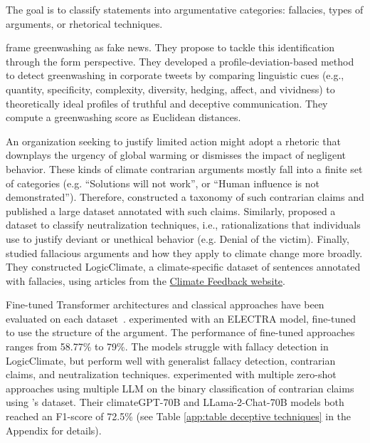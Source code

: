 \task The goal is to classify statements into argumentative categories: fallacies, types of arguments, or rhetorical techniques.

\zeroshot \citet{divinus_oppong-tawiah_corporate_2023} frame greenwashing as fake news. They propose to tackle this identification through the form perspective. 
They developed a profile-deviation-based method to detect greenwashing in corporate tweets by comparing linguistic cues (e.g., quantity, specificity, complexity, diversity, hedging, affect, and vividness) to theoretically ideal profiles of truthful and deceptive communication. They compute a greenwashing score as Euclidean distances.

\datasets An organization seeking to justify limited action might adopt a rhetoric that downplays the urgency of global warming or dismisses the impact of negligent behavior. These kinds of climate contrarian arguments mostly fall into a finite set of categories (e.g. ``Solutions will not work'', or ``Human influence is not demonstrated''). Therefore, \citet{coanComputerassistedClassificationContrarian2021} constructed a taxonomy of such contrarian claims and published a large dataset annotated with such claims. 
Similarly, \citet{bhatia_automatic_2021-1} proposed a dataset to classify neutralization techniques, i.e., rationalizations that individuals use to justify deviant or unethical behavior (e.g. Denial of the victim). Finally, \citet{jin-etal-2022-logical} studied fallacious arguments and how they apply to climate change more broadly. They constructed LogicClimate, a climate-specific dataset of sentences annotated with fallacies, using articles from the \href{https://science.feedback.org/reviews/?_topic=climate}{Climate Feedback website}.

\solutions Fine-tuned Transformer architectures and classical approaches have been evaluated on each dataset~\cite{jin-etal-2022-logical, bhatia_automatic_2021-1, coanComputerassistedClassificationContrarian2021}. \citet{jin-etal-2022-logical} experimented with an ELECTRA model, fine-tuned to use the structure of the argument. The performance of fine-tuned approaches ranges from 58.77\% to 79\%. The models struggle with fallacy detection in LogicClimate, but perform well with generalist fallacy detection, contrarian claims, and neutralization techniques. \citet{thulke2024climategpt} experimented with multiple zero-shot approaches using multiple LLM on the binary classification of contrarian claims using \citet{coanComputerassistedClassificationContrarian2021}'s dataset. Their climateGPT-70B and LLama-2-Chat-70B models both reached an F1-score of 72.5\% (see Table \ref{app:table deceptive techniques} in the Appendix for details). 

